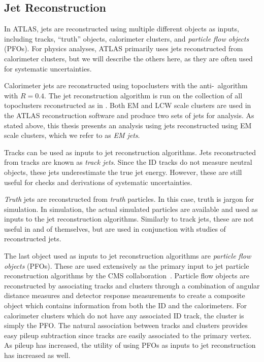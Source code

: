 \subsection{Jet Reconstruction}

In ATLAS, jets are reconstructed using multiple different objects as inputs, including tracks, ``truth'' objects, calorimeter clusters, and \textit{particle flow objects} (PFOs).
For physics analyses, ATLAS primarily uses jets reconstructed from calorimeter clusters, but we will describe the others here, as they are often used for systematic uncertainties.

Calorimeter jets are reconstructed using topoclusters with the anti-\kt~algorithm with $R = 0.4$.
The jet reconstruction algorithm is run on the collection of all topoclusters reconstructed as in .
Both EM and LCW scale clusters are used in the ATLAS reconstruction software and produce two sets of jets for analysis.
As stated above, this thesis presents an analysis using jets reconstructed using EM scale clusters, which we refer to as \textit{EM jets}.

Tracks can be used as inputs to jet reconstruction algorithms.
Jets reconstructed from tracks are known as \textit{track jets}.
Since the ID tracks do not measure neutral objects, these jets underestimate the true jet energy.
However, these are still useful for checks and derivations of systematic uncertainties.

\textit{Truth} jets are reconstructed from \textit{truth} particles.
In this case, truth is jargon for simulation.
In simulation, the actual simulated particles are available and used as inputs to the jet reconstruction algorithms.
Similarly to track jets, these are not useful in and of themselves, but are used in conjunction with studies of reconstructed jets.

The last object used as inputs to jet reconstruction algorithms are \textit{particle flow objects} (PFOs).
These are used extensively as the primary input to jet particle reconstruction algorithms by the CMS collaboration~\cite{CMS:2009nxa}.
Particle flow objects are reconstructed by associating tracks and clusters through a combination of angular distance measures and detector response measurements to create a composite object which contains information from both the ID and the calorimeters.
For calorimeter clusters which do not have any associated ID track, the cluster is simply the PFO.
The natural association between tracks and clusters provides easy pileup subtraction since tracks are easily associated to the primary vertex.
As pileup has increased, the utility of using PFOs as inputs to jet reconstruction has increased as well.

